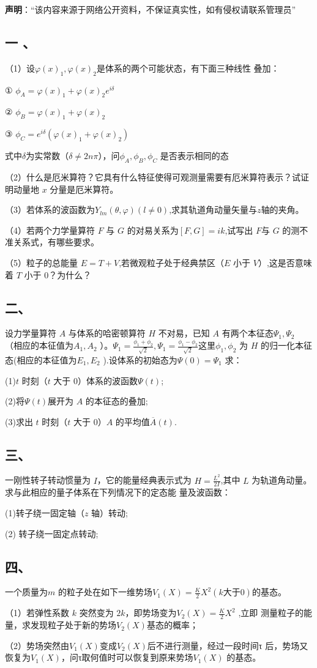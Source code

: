 
\textbf{声明}：“该内容来源于网络公开资料，不保证真实性，如有侵权请联系管理员”

\subsection{一 、}

（1）设$\varphi(x)_1, \varphi(x)_2$是体系的两个可能状态，有下面三种线性
叠加：

① $\phi_A = \varphi(x)_1 + \varphi(x)_2  e^{i\delta}$ 

② $\phi_B= \varphi(x)_1 + \varphi(x)_2 $

③ $\phi_C =e^{i\delta} (\varphi(x)_1 + \varphi(x)_2)$

式中$\delta$为实常数（$\delta \ne 2n\pi$），问$\phi_A ,\phi_B , \phi_C$ 是否表示相同的态

（2）什么是厄米算符？它具有什么特征使得可观测量需要有厄米算符表示？试证明动量地 $x$ 分量是厄米算符。

（3）若体系的波函数为$Y_{lm} (\theta, \varphi)(l\ne 0)$,求其轨道角动量矢量与$z$轴的夹角。

（4）若两个力学量算符 $F$ 与 $G$ 的对易关系为$[F,G]=ik$,试写出 $F$与 $G$ 的测不准关系式，有哪些要求。

（5）粒子的总能量 $E=T+V$,若微观粒子处于经典禁区（$E$ 小于 $V$）,这是否意味着 $T$ 小于 0？为什么？
\subsection{二、}
设力学量算符 $A$ 与体系的哈密顿算符 $H$ 不对易，已知 $A$ 有两个本征态$\Psi_1,\Psi_2 $ （相应的本征值为$A_1 , A_2$  ）。$\Psi_1=\frac{\phi_1+\phi_2}{\sqrt{2}},\Psi_1=\frac{\phi_1-\phi_2}{\sqrt{2}}$这里$\phi_1,\phi_2$ 为 $H$ 的归一化本征态(相应的本征值为$E_1 , E_2$ ).设体系的初始态为$\Psi(0)=\Psi_1$  求：

(1)$t$ 时刻（$t$ 大于 0）体系的波函数$\Psi(t)$;

(2)将$\Psi(t)$展开为 $A$ 的本征态的叠加;

(3)求出 $t$ 时刻（$t$ 大于 0）$A$ 的平均值$\overline A(t)$.
\subsection{三、}
一刚性转子转动惯量为 $I$，它的能量经典表示式为 $H=\frac{L^2}{2I}$,其中
$L$ 为轨道角动量。求与此相应的量子体系在下列情况下的定态能
量及波函数：

(1)转子绕一固定轴（$z$ 轴）转动;

(2) 转子绕一固定点转动;
\subsection{四、}
一个质量为$m$ 的粒子处在如下一维势场$V_1(X) = \frac{K}{2}X^2(k \text{大于} 0)$的基态。

（1）若弹性系数 $k$ 突然变为 $2k$，即势场变为$V_2(X) = \frac{K}{2}X^2$ ,立即
测量粒子的能量，求发现粒子处于新的势场$V_2(X)$基态的概率；

（2）势场突然由$V_1(X)$变成$V_2(X)$后不进行测量，经过一段时间τ
后，势场又恢复为$V_1(X)$，问τ取何值时可以恢复到原来势场$V_1(X)$
的基态。